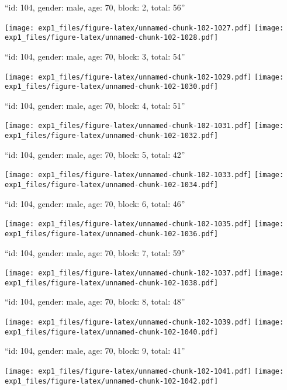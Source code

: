 \documentclass[11pt,,]{article}
\begin{document}
\newpage
[1] 

``id: 104, gender: male, age: 70, block: 2, total: 56''

\texttt{[image: exp1\_files/figure-latex/unnamed-chunk-102-1027.pdf]}
\texttt{[image: exp1\_files/figure-latex/unnamed-chunk-102-1028.pdf]}

\newpage
[1] 

``id: 104, gender: male, age: 70, block: 3, total: 54''

\texttt{[image: exp1\_files/figure-latex/unnamed-chunk-102-1029.pdf]}
\texttt{[image: exp1\_files/figure-latex/unnamed-chunk-102-1030.pdf]}

\newpage
[1] 

``id: 104, gender: male, age: 70, block: 4, total: 51''

\texttt{[image: exp1\_files/figure-latex/unnamed-chunk-102-1031.pdf]}
\texttt{[image: exp1\_files/figure-latex/unnamed-chunk-102-1032.pdf]}

\newpage
[1] 

``id: 104, gender: male, age: 70, block: 5, total: 42''

\texttt{[image: exp1\_files/figure-latex/unnamed-chunk-102-1033.pdf]}
\texttt{[image: exp1\_files/figure-latex/unnamed-chunk-102-1034.pdf]}

\newpage
[1] 

``id: 104, gender: male, age: 70, block: 6, total: 46''

\texttt{[image: exp1\_files/figure-latex/unnamed-chunk-102-1035.pdf]}
\texttt{[image: exp1\_files/figure-latex/unnamed-chunk-102-1036.pdf]}

\newpage
[1] 

``id: 104, gender: male, age: 70, block: 7, total: 59''

\texttt{[image: exp1\_files/figure-latex/unnamed-chunk-102-1037.pdf]}
\texttt{[image: exp1\_files/figure-latex/unnamed-chunk-102-1038.pdf]}

\newpage
[1] 

``id: 104, gender: male, age: 70, block: 8, total: 48''

\texttt{[image: exp1\_files/figure-latex/unnamed-chunk-102-1039.pdf]}
\texttt{[image: exp1\_files/figure-latex/unnamed-chunk-102-1040.pdf]}

\newpage
[1] 

``id: 104, gender: male, age: 70, block: 9, total: 41''

\texttt{[image: exp1\_files/figure-latex/unnamed-chunk-102-1041.pdf]}
\texttt{[image: exp1\_files/figure-latex/unnamed-chunk-102-1042.pdf]}
\end{document}
